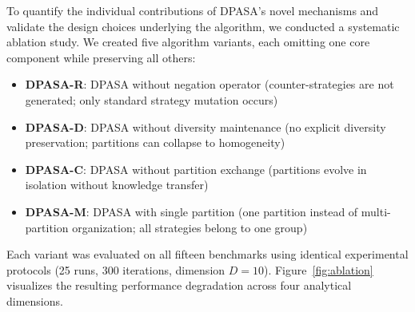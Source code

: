 \documentclass[11pt]{article}
\begin{document}
To quantify the individual contributions of DPASA's novel mechanisms and validate the design choices underlying the algorithm, we conducted a systematic ablation study. We created five algorithm variants, each omitting one core component while preserving all others:
\begin{itemize}

\item \textbf{DPASA-R}: DPASA without negation operator (counter-strategies are not generated; only standard strategy mutation occurs)
\item \textbf{DPASA-D}: DPASA without diversity maintenance (no explicit diversity preservation; partitions can collapse to homogeneity)
\item \textbf{DPASA-C}: DPASA without partition exchange (partitions evolve in isolation without knowledge transfer)
\item \textbf{DPASA-M}: DPASA with single partition (one partition instead of multi-partition organization; all strategies belong to one group)
\end{itemize}

Each variant was evaluated on all fifteen benchmarks using identical experimental protocols (25 runs, 300 iterations, dimension $D=10$). Figure~\ref{fig:ablation} visualizes the resulting performance degradation across four analytical dimensions.
\end{document}
